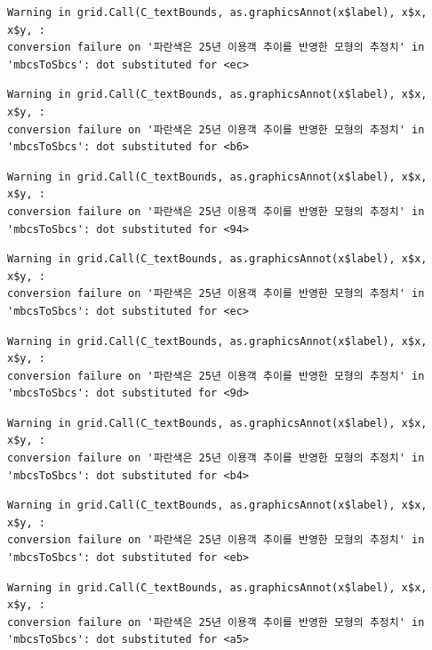 \documentclass[
  letterpaper,
  DIV=11,
  numbers=noendperiod]{scrreprt}
\begin{document}
\begin{verbatim}
Warning in grid.Call(C_textBounds, as.graphicsAnnot(x$label), x$x, x$y, :
conversion failure on '파란색은 25년 이용객 추이를 반영한 모형의 추정치' in
'mbcsToSbcs': dot substituted for <ec>
\end{verbatim}

\begin{verbatim}
Warning in grid.Call(C_textBounds, as.graphicsAnnot(x$label), x$x, x$y, :
conversion failure on '파란색은 25년 이용객 추이를 반영한 모형의 추정치' in
'mbcsToSbcs': dot substituted for <b6>
\end{verbatim}

\begin{verbatim}
Warning in grid.Call(C_textBounds, as.graphicsAnnot(x$label), x$x, x$y, :
conversion failure on '파란색은 25년 이용객 추이를 반영한 모형의 추정치' in
'mbcsToSbcs': dot substituted for <94>
\end{verbatim}

\begin{verbatim}
Warning in grid.Call(C_textBounds, as.graphicsAnnot(x$label), x$x, x$y, :
conversion failure on '파란색은 25년 이용객 추이를 반영한 모형의 추정치' in
'mbcsToSbcs': dot substituted for <ec>
\end{verbatim}

\begin{verbatim}
Warning in grid.Call(C_textBounds, as.graphicsAnnot(x$label), x$x, x$y, :
conversion failure on '파란색은 25년 이용객 추이를 반영한 모형의 추정치' in
'mbcsToSbcs': dot substituted for <9d>
\end{verbatim}

\begin{verbatim}
Warning in grid.Call(C_textBounds, as.graphicsAnnot(x$label), x$x, x$y, :
conversion failure on '파란색은 25년 이용객 추이를 반영한 모형의 추정치' in
'mbcsToSbcs': dot substituted for <b4>
\end{verbatim}

\begin{verbatim}
Warning in grid.Call(C_textBounds, as.graphicsAnnot(x$label), x$x, x$y, :
conversion failure on '파란색은 25년 이용객 추이를 반영한 모형의 추정치' in
'mbcsToSbcs': dot substituted for <eb>
\end{verbatim}

\begin{verbatim}
Warning in grid.Call(C_textBounds, as.graphicsAnnot(x$label), x$x, x$y, :
conversion failure on '파란색은 25년 이용객 추이를 반영한 모형의 추정치' in
'mbcsToSbcs': dot substituted for <a5>
\end{verbatim}
\end{document}
